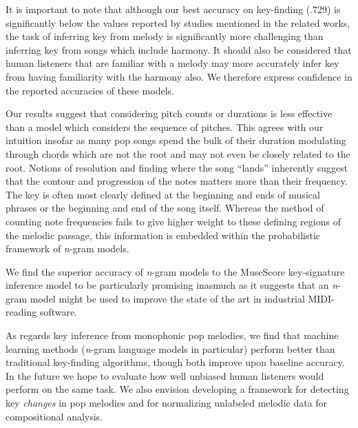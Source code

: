 \documentclass[letterpaper]{article}
\begin{document}
It is important to note that although our best accuracy on key-finding (.729) is significantly below the values reported by studies mentioned in the related works, the task of inferring key from melody is significantly more challenging than inferring key from songs which include harmony. It should also be considered that human listeners that are familiar with a melody may more accurately infer key from having familiarity with the harmony also. We therefore express confidence in the reported accuracies of these models.

Our results suggest that considering pitch counts or durations is less effective than a model which considers the sequence of pitches. This agrees with our intuition insofar as many pop songs spend the bulk of their duration modulating through chords which are not the root and may not even be closely related to the root. Notions of resolution and finding where the song ``lands'' inherently suggest that the contour and progression of the notes matters more than their frequency. The key is often most clearly defined at the beginning and ends of musical phrases or the beginning and end of the song itself. Whereas the method of counting note frequencies fails to give higher weight to these defining regions of the melodic passage, this information is embedded within the probabilistic framework of \emph{n}-gram models.

We find the superior accuracy of \emph{n}-gram models to the MuseScore key-signature inference model to be particularly promising inasmuch as it suggests that an \emph{n}-gram model might be used to improve the state of the art in industrial MIDI-reading software.

As regards key inference from monophonic pop melodies, we find that machine learning methods (\emph{n}-gram language models in particular) perform better than traditional key-finding algorithms, though both improve upon baseline accuracy. In the future we hope to evaluate how well unbiased human listeners would perform on the same task. We also envision developing a framework for detecting key \emph{changes} in pop melodies and for normalizing unlabeled melodic data for compositional analysis. 



\end{document}
